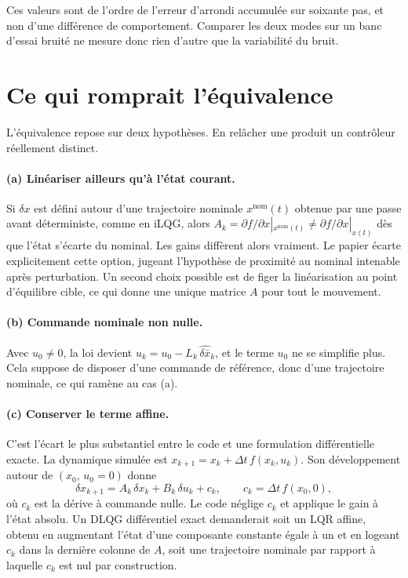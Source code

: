 \documentclass[11pt,a4paper]{article}
\begin{document}
\noindent
Ces valeurs sont de l'ordre de l'erreur d'arrondi accumulée sur soixante pas, et non d'une
différence de comportement. Comparer les deux modes sur un banc d'essai bruité ne mesure donc
rien d'autre que la variabilité du bruit.

\section{Ce qui romprait l'équivalence}
L'équivalence repose sur deux hypothèses. En relâcher une produit un contrôleur réellement
distinct.

\paragraph{(a) Linéariser ailleurs qu'à l'état courant.}
Si $\delta x$ est défini autour d'une trajectoire nominale $x^{\text{nom}}(t)$ obtenue par une
passe avant déterministe, comme en iLQG, alors
$A_k=\partial f/\partial x|_{x^{\text{nom}}(t)}\neq\partial f/\partial x|_{x(t)}$ dès que l'état
s'écarte du nominal. Les gains diffèrent alors vraiment. Le papier écarte explicitement cette
option, jugeant l'hypothèse de proximité au nominal intenable après perturbation. Un second
choix possible est de figer la linéarisation au point d'équilibre cible, ce qui donne une unique
matrice $A$ pour tout le mouvement.

\paragraph{(b) Commande nominale non nulle.}
Avec $u_0\neq0$, la loi devient $u_k=u_0-L_k\,\widehat{\delta\bar x}_k$, et le terme $u_0$ ne se
simplifie plus. Cela suppose de disposer d'une commande de référence, donc d'une trajectoire
nominale, ce qui ramène au cas (a).

\paragraph{(c) Conserver le terme affine.}
C'est l'écart le plus substantiel entre le code et une formulation différentielle exacte. La
dynamique simulée est $x_{k+1}=x_k+\Delta t\,f(x_k,u_k)$. Son développement autour de
$(x_0,\,u_0=0)$ donne
\[
 \delta x_{k+1}=A_k\,\delta x_k+B_k\,\delta u_k+c_k,
 \qquad c_k=\Delta t\,f(x_0,0),
\]
où $c_k$ est la dérive à commande nulle. Le code néglige $c_k$ et applique le gain à l'état
absolu. Un DLQG différentiel exact demanderait soit un LQR affine, obtenu en augmentant l'état
d'une composante constante égale à un et en logeant $c_k$ dans la dernière colonne de $A$, soit
une trajectoire nominale par rapport à laquelle $c_k$ est nul par construction.
\end{document}
